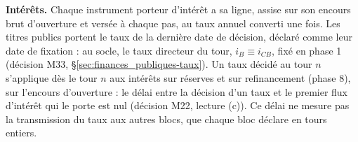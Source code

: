 \documentclass[11pt,a4paper]{article}
\begin{document}
\begin{proposee}
\textbf{Intérêts.} Chaque instrument porteur d'intérêt a sa ligne, assise sur son encours brut d'ouverture et versée à chaque pas, au taux annuel converti une fois. Les titres publics portent le taux de la dernière date de décision, déclaré comme leur date de fixation : au socle, le taux directeur du tour, $i_B \equiv i_{\mathit{CB}}$, fixé en phase 1 (décision M33, \S\ref{sec:finances_publiques-taux}). Un taux décidé au tour $n$ s'applique dès le tour $n$ aux intérêts sur réserves et sur refinancement (phase 8), sur l'encours d'ouverture : le délai entre la décision d'un taux et le premier flux d'intérêt qui le porte est nul (décision M22, lecture (c)). Ce délai ne mesure pas la transmission du taux aux autres blocs, que chaque bloc déclare en tours entiers.
\end{proposee}
\end{document}
